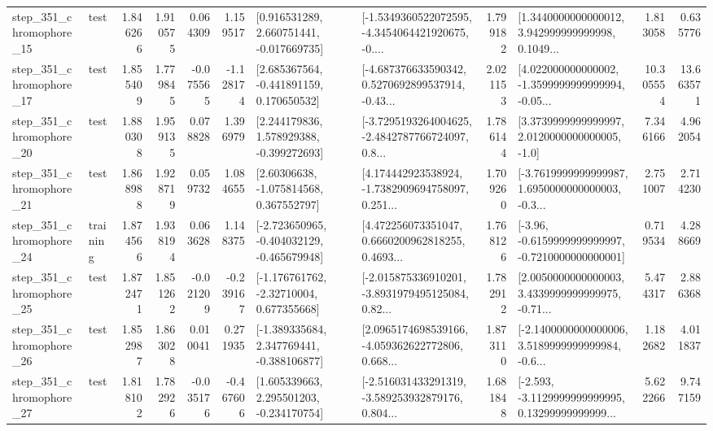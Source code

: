 \begin{tabular}{llrrrrllrlrr}
  step\_351\_chromophore\_15 &      test &      1.846266 &    1.910575 &      0.064309 &  1.159517 &    [0.916531289, 2.660751441, -0.017669735] &  [-1.5349360522072595, -4.3454064421920675, -0.... &       1.799182 &  [1.3440000000000012, 3.942999999999998, 0.1049... &            1.813058 &          0.635776 \\
  step\_351\_chromophore\_17 &      test &      1.855409 &    1.779845 &     -0.075565 & -1.128174 &    [2.685367564, -0.441891159, 0.170650532] &  [-4.687376633590342, 0.5270692899537914, -0.43... &       2.021153 &  [4.022000000000002, -1.3599999999999994, -0.05... &           10.305554 &         13.663571 \\
  step\_351\_chromophore\_20 &      test &      1.880308 &    1.959135 &      0.078828 &  1.396979 &    [2.244179836, 1.578929388, -0.399272693] &  [-3.7295193264004625, -2.4842787766724097, 0.8... &       1.786144 &     [3.3739999999999997, 2.0120000000000005, -1.0] &            7.346166 &          4.962054 \\
  step\_351\_chromophore\_21 &      test &      1.868988 &    1.928719 &      0.059732 &  1.084655 &     [2.60306638, -1.075814568, 0.367552797] &  [4.174442923538924, -1.7382909694758097, 0.251... &       1.709260 &  [-3.7619999999999987, 1.6950000000000003, -0.3... &            2.751007 &          2.714230 \\
  step\_351\_chromophore\_24 &  training &      1.874566 &    1.938194 &      0.063628 &  1.148375 &  [-2.723650965, -0.404032129, -0.465679948] &  [4.472256073351047, 0.6660200962818255, 0.4693... &       1.768126 &  [-3.96, -0.6159999999999997, -0.7210000000000001] &            0.719534 &          4.288669 \\
  step\_351\_chromophore\_25 &      test &      1.872471 &    1.851262 &     -0.021209 & -0.239167 &    [-1.176761762, -2.32710004, 0.677355668] &  [-2.015875336910201, -3.8931979495125084, 0.82... &       1.782912 &  [2.0050000000000003, 3.4339999999999975, -0.71... &            5.474317 &          2.886368 \\
  step\_351\_chromophore\_26 &      test &      1.852987 &    1.863028 &      0.010041 &  0.271935 &   [-1.389335684, 2.347769441, -0.388106877] &  [2.0965174698539166, -4.059362622772806, 0.668... &       1.873110 &  [-2.1400000000000006, 3.5189999999999984, -0.6... &            1.182682 &          4.011837 \\
  step\_351\_chromophore\_27 &      test &      1.818102 &    1.782926 &     -0.035176 & -0.467606 &    [1.605339663, 2.295501203, -0.234170754] &  [-2.516031433291319, -3.589253932879176, 0.804... &       1.681848 &  [-2.593, -3.1129999999999995, 0.13299999999999... &            5.622266 &          9.747159 \\

\end{tabular}
